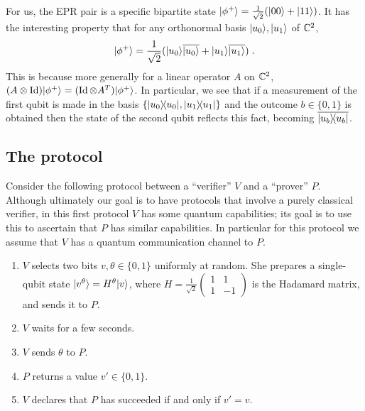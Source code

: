 For us, the EPR pair is a specific bipartite state $|\phi^+\rangle = \frac{1}{\sqrt{2}}(|00\rangle+|11\rangle)$. It has the interesting property that for any orthonormal basis $|u_0\rangle,|u_1\rangle$ of $\mathbb{C}^2$, 
\begin{equation}\label{eq:epr-shift}
|\phi^+\rangle = \frac{1}{\sqrt{2}}(|u_0\rangle\overline{|u_0\rangle}+|u_1\rangle\overline{|u_1\rangle})\;.
\end{equation} This is because more generally for a linear operator $A$ on $\mathbb{C}^2$, $(A\otimes \mathop{\rm Id}\nolimits)|\phi^+\rangle = (\mathop{\rm Id}\nolimits\otimes A^T)|\phi^+\rangle$. In particular, we see that if a measurement of the first qubit is made in the basis $\{|u_0\rangle\!\langle u_0|,|u_1\rangle\!\langle u_1|\}$ and the outcome $b\in \{0,1\}$ is obtained then the state of the second qubit reflects this fact, becoming $\overline{|u_b\rangle\!\langle u_b|}$. 


\subsection{The protocol}
\label{sec:firstprotocol}

Consider the following protocol between a ``verifier'' $V$ and a ``prover'' $P$. Although ultimately our goal is to have protocols that involve a purely classical verifier, in this first protocol $V$ has some quantum capabilities; its goal is to use this to ascertain that $P$ has similar capabilities. In particular for this protocol we assume that $V$ has a quantum communication channel to $P$. 

\begin{enumerate}
\item $V$ selects two bits $v,\theta\in\{0,1\}$ uniformly at random. She prepares a single-qubit state $|v^\theta\rangle = H^\theta |v\rangle$, where $H = \frac{1}{\sqrt{2}} \begin{pmatrix} 1 & 1 \\ 1 & -1\end{pmatrix}$ is the Hadamard matrix, and sends it to $P$. 
\item $V$ waits for a few seconds. 
\item $V$ sends $\theta$ to $P$. 
\item $P$ returns a value $v'\in\{0,1\}$. 
\item $V$ declares that $P$ has succeeded if and only if $v'=v$.
\end{enumerate}

